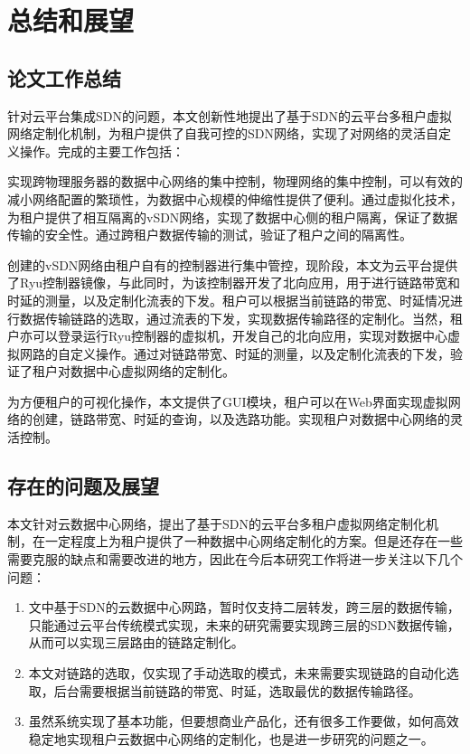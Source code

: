 \chapter{总结和展望}
\section{论文工作总结}
针对云平台集成SDN的问题，本文创新性地提出了基于SDN的云平台多租户虚拟网络定制化机制，为租户提供了自我可控的SDN网络，实现了对网络的灵活自定义操作。完成的主要工作包括：

实现跨物理服务器的数据中心网络的集中控制，物理网络的集中控制，可以有效的减小网络配置的繁琐性，为数据中心规模的伸缩性提供了便利。通过虚拟化技术，为租户提供了相互隔离的vSDN网络，实现了数据中心侧的租户隔离，保证了数据传输的安全性。通过跨租户数据传输的测试，验证了租户之间的隔离性。

创建的vSDN网络由租户自有的控制器进行集中管控，现阶段，本文为云平台提供了Ryu控制器镜像，与此同时，为该控制器开发了北向应用，用于进行链路带宽和时延的测量，以及定制化流表的下发。租户可以根据当前链路的带宽、时延情况进行数据传输链路的选取，通过流表的下发，实现数据传输路径的定制化。当然，租户亦可以登录运行Ryu控制器的虚拟机，开发自己的北向应用，实现对数据中心虚拟网路的自定义操作。通过对链路带宽、时延的测量，以及定制化流表的下发，验证了租户对数据中心虚拟网络的定制化。

为方便租户的可视化操作，本文提供了GUI模块，租户可以在Web界面实现虚拟网络的创建，链路带宽、时延的查询，以及选路功能。实现租户对数据中心网络的灵活控制。

\section{存在的问题及展望}
本文针对云数据中心网络，提出了基于SDN的云平台多租户虚拟网络定制化机制，在一定程度上为租户提供了一种数据中心网络定制化的方案。但是还存在一些需要克服的缺点和需要改进的地方，因此在今后本研究工作将进一步关注以下几个问题：

\begin{enumerate}[1)]
\item 文中基于SDN的云数据中心网路，暂时仅支持二层转发，跨三层的数据传输，只能通过云平台传统模式实现，未来的研究需要实现跨三层的SDN数据传输，从而可以实现三层路由的链路定制化。
\item 本文对链路的选取，仅实现了手动选取的模式，未来需要实现链路的自动化选取，后台需要根据当前链路的带宽、时延，选取最优的数据传输路径。
\item 虽然系统实现了基本功能，但要想商业产品化，还有很多工作要做，如何高效稳定地实现租户云数据中心网络的定制化，也是进一步研究的问题之一。
\end{enumerate}